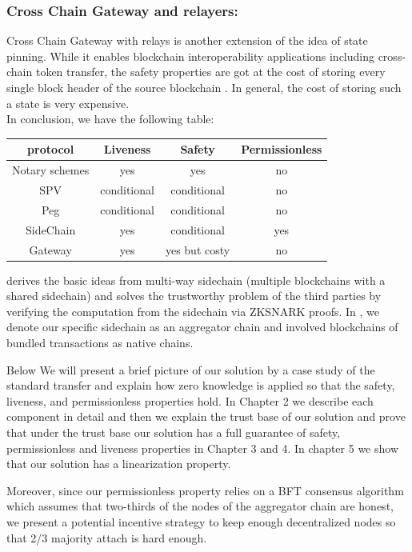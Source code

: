 \documentclass[pageno]{jpaper}
\begin{document}
\subsubsection{Cross Chain Gateway and relayers:}
    Cross Chain Gateway with relays is another extension of the idea of state pinning. While it enables blockchain interoperability applications including cross-chain token transfer, the safety properties are got at the cost of storing every single block header of the source blockchain \cite{belchior2021survey}. In general, the cost of storing such a state is very expensive.
\\
\newline
In conclusion, we have the following table:
\begin{table}[h]
\small
\centering
\begin{tabular}{ | c | c | c | c | }
\hline
protocol & Liveness & Safety & Permissionless \\
\hline
Notary schemes & yes & yes & no\\
\hline
SPV & conditional & conditional & no \\
\hline
Peg & conditional & conditional & no \\
\hline
SideChain & yes & conditional & yes \\ 
\hline
Gateway& yes & yes but costy & no \\ 
\hline
\end{tabular}
\end{table}

\dprotocol derives the basic ideas from multi-way sidechain (multiple blockchains with a shared sidechain) and solves the trustworthy problem of the third parties by verifying the computation from the sidechain via ZKSNARK proofs. In \dprotocol, we denote our specific sidechain as an aggregator chain and involved blockchains of bundled transactions as native chains.

Below We will present a brief picture of our solution by a case study of the standard transfer and explain how zero knowledge is applied so that the safety, liveness, and permissionless properties hold. In Chapter 2 we describe each component in detail and then we explain the trust base of our solution and prove that under the trust base our solution has a full guarantee of safety, permissionless and liveness properties in Chapter 3 and 4. In chapter 5 we show that our solution has a linearization property. 

Moreover, since our permissionless property relies on a BFT consensus algorithm which assumes that two-thirds of the nodes of the aggregator chain are honest, we present a potential incentive strategy to keep enough decentralized nodes so that 2/3 majority attach is hard enough.
\end{document}

